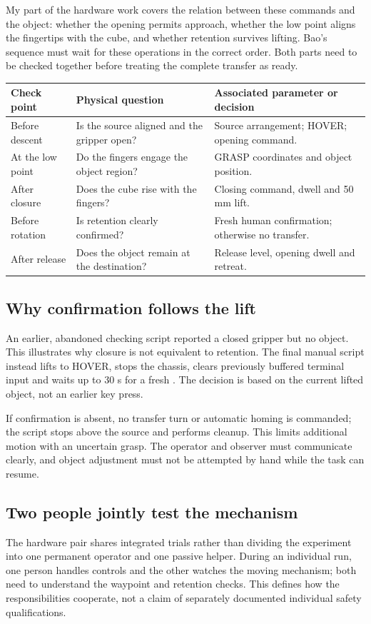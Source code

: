 My part of the hardware work covers the relation between these commands and the object: whether the opening permits approach, whether the low point aligns the fingertips with the cube, and whether retention survives lifting. Bao's sequence must wait for these operations in the correct order. Both parts need to be checked together before treating the complete transfer as ready.
\begin{center}\small
\begin{tabularx}{\linewidth}{@{}p{31mm}YY@{}}\toprule
Check point & Physical question & Associated parameter or decision\\\midrule
Before descent & Is the source aligned and the gripper open? & Source arrangement; HOVER; opening command.\\
At the low point & Do the fingers engage the object region? & GRASP coordinates and object position.\\
After closure & Does the cube rise with the fingers? & Closing command, dwell and 50 mm lift.\\
Before rotation & Is retention clearly confirmed? & Fresh human confirmation; otherwise no transfer.\\
After release & Does the object remain at the destination? & Release level, opening dwell and retreat.\\\bottomrule
\end{tabularx}
\end{center}
\subsection{Why confirmation follows the lift}
An earlier, abandoned checking script reported a closed gripper but no object. This illustrates why closure is not equivalent to retention. The final manual script instead lifts to HOVER, stops the chassis, clears previously buffered terminal input and waits up to 30 s for a fresh . The decision is based on the current lifted object, not an earlier key press.

If confirmation is absent, no transfer turn or automatic homing is commanded; the script stops above the source and performs cleanup. This limits additional motion with an uncertain grasp. The operator and observer must communicate clearly, and object adjustment must not be attempted by hand while the task can resume.
\subsection{Two people jointly test the mechanism}
The hardware pair shares integrated trials rather than dividing the experiment into one permanent operator and one passive helper. During an individual run, one person handles controls and the other watches the moving mechanism; both need to understand the waypoint and retention checks. This defines how the responsibilities cooperate, not a claim of separately documented individual safety qualifications.
\clearpage
